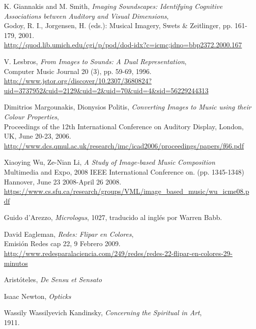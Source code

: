 \begin{thebibliography}{9}
 K. Giannakis and M. Smith,
 \emph{Imaging Soundscapes: Identifying Cognitive Associations between Auditory and Visual Dimensions},\\
 Godoy, R. I., Jorgensen, H. (eds.): Musical Imagery, Swets \& Zeitlinger, pp. 161-179, 2001.\\
 \url{http://quod.lib.umich.edu/cgi/p/pod/dod-idx?c=icmc;idno=bbp2372.2000.167}

 V. Lesbros,
 \emph{From Images to Sounds: A Dual Representation},\\
 Computer Music Journal 20 (3), pp. 59-69, 1996.\\
 \url{http://www.jstor.org/discover/10.2307/3680824?uid=3737952&uid=2129&uid=2&uid=70&uid=4&sid=56229244313}

 Dimitrios Margounakis, Dionysios Politis,
 \emph{Converting Images to Music using their Colour Properties},\\ 
 Proceedings of the 12th International Conference on Auditory Display, London, UK, June 20-23, 2006.\\
 \url{http://www.dcs.qmul.ac.uk/research/imc/icad2006/proceedings/papers/f66.pdf}

 Xiaoying Wu, Ze-Nian Li,
 \emph{A Study of Image-based Music Composition}
 Multimedia and Expo, 2008 IEEE International Conference on. (pp. 1345-1348)\\
 Hannover, June 23 2008-April 26 2008.\\
 \url{https://www.cs.sfu.ca/research/groups/VML/image_based_music/wu_icme08.pdf}

 Guido d'Arezzo,
 \emph{Micrologus},
 1027,
 traducido al inglés por Warren Babb.

 David Eagleman,
 \emph{Redes: Flipar en Colores},\\
 Emisión Redes cap 22, 9 Febrero 2009.\\
 \url{http://www.redesparalaciencia.com/249/redes/redes-22-flipar-en-colores-29-minutos}

 Aristóteles,
 \emph{De Sensu et Sensato}

 Isaac Newton,
 \emph{Opticks}

 Wassily Wassilyevich Kandinsky,
 \emph{Concerning the Spiritual in Art},\\
 1911.


\end{thebibliography}
